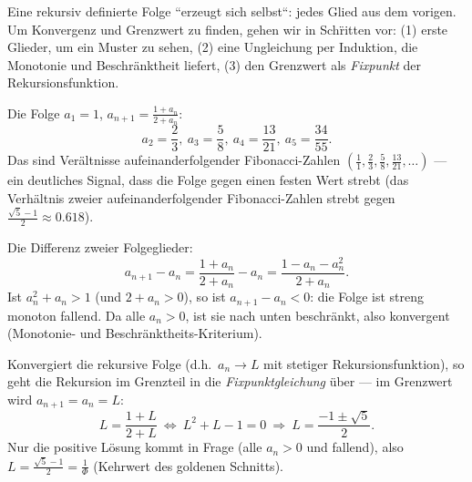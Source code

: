 


Eine rekursiv definierte Folge ``erzeugt sich selbst``: jedes Glied aus
dem vorigen. Um Konvergenz und Grenzwert zu finden, gehen wir in
Sch\"ritten vor: (1) erste Glieder, um ein Muster zu sehen, (2) eine
Ungleichung per Induktion, die Monotonie und Beschr\"anktheit liefert,
(3) den Grenzwert als \emph{Fixpunkt} der Rekursionsfunktion.

\begin{werkzeugkasten}
Die Folge $a_1=1$, $a_{n+1}=\frac{1+a_n}{2+a_n}$:
\begin{equation}
  a_2=\frac2 3,\ a_3=\frac5 8,\ a_4=\frac{13}{21},\ a_5=\frac{34}{55}.
\end{equation}
Das sind Ver\"altnisse aufeinanderfolgender Fibonacci-Zahlen
$(\tfrac{1}{1},\tfrac2 3,\tfrac5 8,\tfrac{13}{21},\dots)$ --- ein
deutliches Signal, dass die Folge gegen einen festen Wert strebt
(das Verh\"altnis zweier aufeinanderfolgender Fibonacci-Zahlen strebt
gegen $\frac{\sqrt5-1}2\approx0.618$).
\end{werkzeugkasten}

\begin{werkzeugkasten}
Die Differenz zweier Folgeglieder:
\begin{equation}
  a_{n+1}-a_n=\frac{1+a_n}{2+a_n}-a_n
  =\frac{1-a_n-a_n^2}{2+a_n}.
\end{equation}
Ist $a_n^2+a_n>1$ (und $2+a_n>0$), so ist $a_{n+1}-a_n<0$: die Folge ist
streng monoton fallend. Da alle $a_n>0$, ist sie nach unten beschr\"ankt,
also konvergent (Monotonie- und Beschr\"anktheits-Kriterium).
\end{werkzeugkasten}

\begin{werkzeugkasten}
Konvergiert die rekursive Folge (d.h.\ $a_n\to L$ mit stetiger
Rekursionsfunktion), so geht die Rekursion im Grenzteil in die
\emph{Fixpunktgleichung} \"uber --- im Grenzwert wird $a_{n+1}=a_n=L$:
\begin{equation}
  L=\frac{1+L}{2+L}\ \Longleftrightarrow\ L^2+L-1=0\ \Longrightarrow\
  L=\frac{-1\pm\sqrt5}2 .
\end{equation}
Nur die positive L\"osung kommt in Frage (alle $a_n>0$ und fallend),
also $L=\frac{\sqrt5-1}2=\frac1{\Phi}$ (Kehrwert des goldenen Schnitts).
\end{werkzeugkasten}

